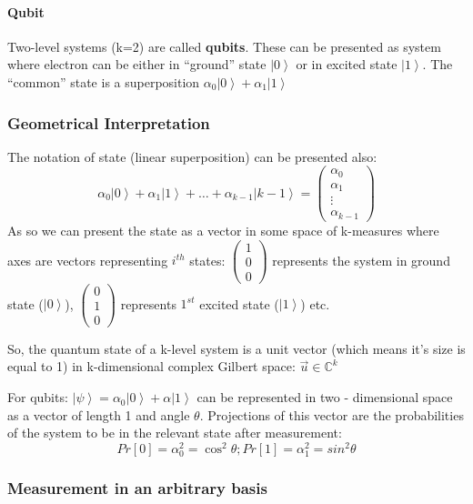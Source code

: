 \documentclass{scrartcl}
\newcommand{\cplx}{\mathbb{C}} %
\newcommand{\ket}[1]{\left| #1 \right>} %
\begin{document}
\paragraph{Qubit}

Two-level systems (k=2) are called {\bf qubits}. These can be presented as
system where electron can be either in ``ground'' state $\ket0$ or in excited
state $\ket1$. The ``common'' state is a superposition $\alpha_0 \ket0 +
\alpha_1 \ket1$

\subsubsection{Geometrical Interpretation}
\label{sec:2-2}

The notation of state (linear superposition) can be presented also:
\[\alpha_0 \ket0 + \alpha_1 \ket1 + \dots +
\alpha_{k-1} \ket{k-1} = \begin{pmatrix} \alpha_0 \\ \alpha_1 \\ \vdots \\
  \alpha_{k-1} \end{pmatrix}\] As so we can present the state as a vector in
some space of k-measures where axes are vectors representing $i^{th}$ states:
$\begin{pmatrix} 1 \\ 0 \\ 0 \end{pmatrix}$ represents the system in ground
state ($\ket0$), $\begin{pmatrix} 0 \\ 1 \\ 0 \end{pmatrix}$ represents $1^{st}$
excited state ($\ket1$) etc.

So, the quantum state of a k-level system is a unit vector (which means it's
size is equal to 1) in k-dimensional complex Gilbert space: $\vec u \in \cplx^k$

For qubits: $\ket\psi = \alpha_0 \ket0 + \alpha \ket1$ can be represented in two
- dimensional space as a vector of length 1 and angle $\theta$. Projections of
this vector are the probabilities of the system to be in the relevant state
after measurement:
\[ Pr[0] = \alpha_0^2 = \cos^2 \theta; Pr[1] = \alpha_1^2 = sin^2 \theta\]

\subsubsection{Measurement in an arbitrary basis}
\label{sec:2-3}
\end{document}
